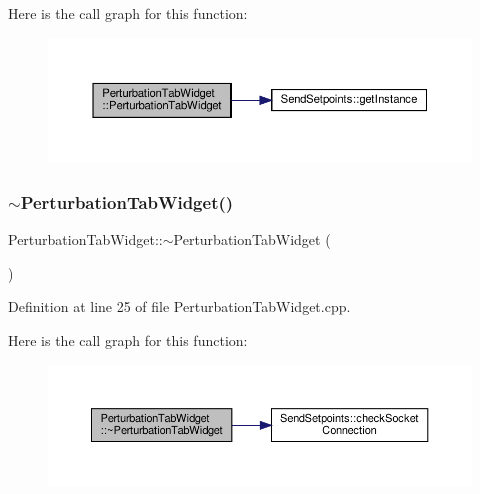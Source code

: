 Here is the call graph for this function\+:
\nopagebreak
\begin{figure}[H]
\begin{center}
\leavevmode
\includegraphics[width=350pt]{class_perturbation_tab_widget_a7a398b91c41f2f94b880909da745f29a_cgraph}
\end{center}
\end{figure}
\mbox{\label{class_perturbation_tab_widget_a8c2ec5ad166d2a5bac3f383210b24fbf}} 
\subsubsection{\texorpdfstring{$\sim$\+Perturbation\+Tab\+Widget()}{~PerturbationTabWidget()}}
{\footnotesize\ttfamily Perturbation\+Tab\+Widget\+::$\sim$\+Perturbation\+Tab\+Widget (\begin{DoxyParamCaption}{ }\end{DoxyParamCaption})}



Definition at line 25 of file Perturbation\+Tab\+Widget.\+cpp.

Here is the call graph for this function\+:
\nopagebreak
\begin{figure}[H]
\begin{center}
\leavevmode
\includegraphics[width=350pt]{class_perturbation_tab_widget_a8c2ec5ad166d2a5bac3f383210b24fbf_cgraph}
\end{center}
\end{figure}


